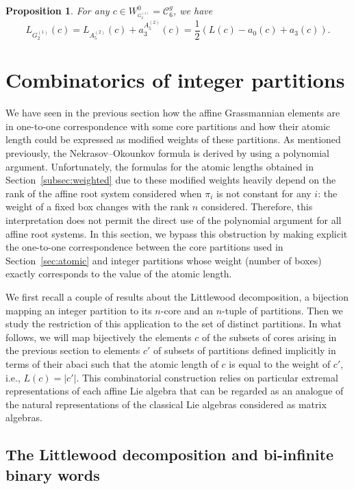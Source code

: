 \documentclass[pdftex]{sigma}
\newtheorem{Proposition}[Theorem]{Proposition}
 { \theoremstyle{definition}
\newtheorem{Definition}[Theorem]{Definition}
\newtheorem{Note}[Theorem]{Note}
\newtheorem{Example}[Theorem]{Example}
\newtheorem{Remark}[Theorem]{Remark} }
\numberwithin{equation}{section}
\begin{document}
\begin{Proposition}\label{Prop_G(2,1)}
	For any $c\in W_{^{G_{2}^{(1)}}}^{0}=\mathcal{C}_{6}^{g}$, we have
	\begin{equation*}
	L_{G_{2}^{(1)}}(c)=L_{A_{5}^{(2)}}(c)+a_{3}^{A_{5}^{(2)}}(c)=\frac{1}{2}
	(L(c)-a_{0}(c)+a_{3}(c)).
	\end{equation*}
\end{Proposition}

\section{Combinatorics of integer partitions}\label{sec:combi}


We have seen in the previous section how the affine Grassmannian elements are in one-to-one correspondence with some core partitions and how their atomic length could be expressed as modified weights of these partitions. As mentioned previously, the Nekrasov--Okounkov formula is derived by using a polynomial argument. Unfortunately, the formulas for the atomic lengths obtained in Section~\ref{subsec:weighted} due to these modified weights heavily depend on the rank of the affine root system considered when $\pi_i$ is not constant for any $i$: the weight of a fixed box changes with the rank $n$ considered. Therefore, this interpretation does not permit the direct use of the polynomial argument for all affine root systems. In this section, we bypass this obstruction by making explicit the one-to-one correspondence between the core partitions used in Section~\ref{sec:atomic} and integer partitions whose weight (number of boxes) exactly corresponds to the value of the atomic length.

We first recall a couple of results about the Littlewood decomposition, a bijection mapping an integer partition to its $n$-core and an $n$-tuple of partitions. Then we study the restriction of this application to the set of distinct partitions.
In what follows, we will map bijectively the elements $c$ of the subsets of cores arising in the previous section to elements $c'$ of subsets of partitions defined implicitly in terms of their abaci such that the atomic length of $c$ is equal to the weight of $c'$, i.e., $L(c)=\lvert c'\rvert$. This combinatorial construction relies on particular extremal representations of each affine Lie algebra that can be regarded as an analogue of the natural representations of the classical Lie algebras considered as matrix algebras.

\subsection{The Littlewood decomposition and bi-infinite binary words}
\end{document}
